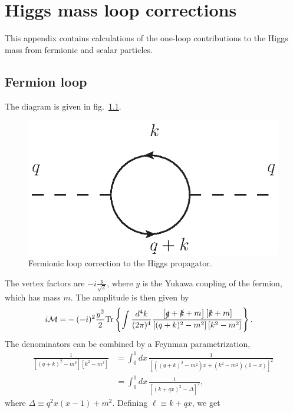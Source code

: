 \documentclass[twoside,english]{uiofysmaster}
\begin{document}
\chapter{Higgs mass loop corrections}
\label{appendix:higgs_mass_loop_correction}
This appendix contains calculations of the one-loop contributions to the Higgs mass from fermionic and scalar particles.

\section{Fermion loop}
The diagram is given in fig.\ \ref{fig:appendix_higgs_top_loop}.
\begin{figure}[hbt]
\centering
\includegraphics[scale=1]{figures/appendix/higgs_top_loop_with_momenta.eps}
\caption{Fermionic loop correction to the Higgs propagator.}
\label{fig:appendix_higgs_top_loop}
\end{figure}
The vertex factors are $-i\frac{y}{\sqrt{2}}$, where $y$ is the Yukawa coupling of the fermion, which has mass $m$. The amplitude is then given by
\begin{align}
	i\mathcal{M} =& -(-i)^2\frac{y^2}{2} \mathrm{Tr}\left\{ \int \frac{d^4 k}{(2\pi)^4} \frac{\left[ \slashed q + \slashed k + m \right]\left[ \slashed k + m \right]}{\left[(q+k)^2 - m^2 \right] \left[ k^2 - m^2 \right]}  \right\}.
\end{align}
The denominators can be combined by a Feynman parametrization,
\begin{align}
	\frac{1}{\left[(q+k)^2 - m^2 \right] \left[ k^2 - m^2 \right]} &= \int_0^1 dx\, \frac{1}{\left[\left( (q+k)^2 - m^2\right) x + \left(k^2 -m^2 \right)(1-x)\right]^2}\nonumber \\
	&= \int_0^1 dx \, \frac{1}{\left[(k+qx)^2 - \Delta\right]^2},
\end{align}
where $\Delta \equiv q^2x(x-1)+m^2$. Defining $\ell \equiv k+qx$, we get
\end{document}
